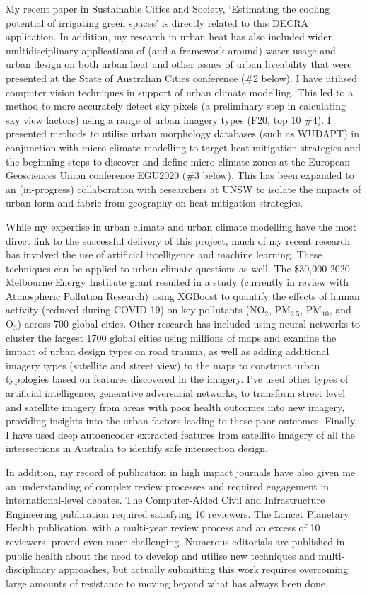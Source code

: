 My recent paper in Sustainable Cities and Society, `Estimating the cooling potential of irrigating green spaces' is directly related to this DECRA application. In addition, my research in urban heat has also included wider multidisciplinary applications of (and a framework around) water usage and urban design on both urban heat and other issues of urban liveability that were presented at the State of Australian Cities conference (\#2 below). I have utilised computer vision techniques in support of urban climate modelling. This led to a method to more accurately detect sky pixels (a preliminary step in calculating sky view factors) using a range of urban imagery types (F20, top 10 \#4). I presented methods to utilise urban morphology databases (such as WUDAPT) in conjunction with micro-climate modelling to target heat mitigation strategies and the beginning steps to discover and define micro-climate zones at the European Geosciences Union conference EGU2020 (\#3 below). This has been expanded to an (in-progress) collaboration with researchers at UNSW to isolate the impacts of urban form and fabric from geography on heat mitigation strategies.

While my expertise in urban climate and urban climate modelling have the most direct link to the successful delivery of this project, much of my recent research has involved the use of artificial intelligence and machine learning. These techniques can be applied to urban climate questions as well. The \$30,000 2020 Melbourne Energy Institute grant resulted in a study (currently in review with Atmospheric Pollution Research) using XGBoost to quantify the effects of human activity (reduced during COVID-19) on key pollutants (NO$_{2}$, PM$_{2.5}$, PM$_{10}$, and O$_{3}$) across 700 global cities. Other research has included using neural networks to cluster the largest 1700 global cities using millions of maps and examine the impact of urban design types on road trauma, as well as adding additional imagery types (satellite and street view) to the maps to construct urban typologies based on features discovered in the imagery. I've used other types of artificial intelligence, generative adversarial networks, to transform street level and satellite imagery from areas with poor health outcomes into new imagery, providing insights into the urban factors leading to these poor outcomes. Finally, I have used deep autoencoder extracted features from satellite imagery of all the intersections in Australia to identify safe intersection design. 

In addition, my record of publication in high impact journals have also given me an understanding of complex review processes and required engagement in international-level debates. The Computer-Aided Civil and Infrastructure Engineering publication required satisfying 10 reviewers. The Lancet Planetary Health publication, with a multi-year review process and an excess of 10 reviewers, proved even more challenging. Numerous editorials are published in public health about the need to develop and utilise new techniques and multi-disciplinary approaches, but actually submitting this work requires overcoming large amounts of resistance to moving beyond what has always been done.

